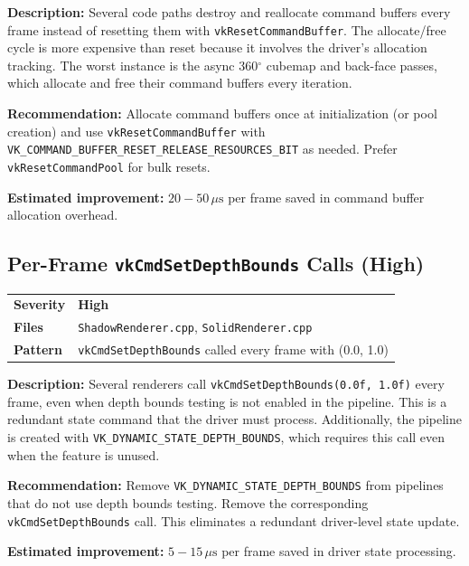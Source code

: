 \documentclass[a4paper,10pt]{article}
\newcommand{\us}{\ensuremath{\,\mu\text{s}}}
\newcommand{\degree}{\ensuremath{^\circ}}
\newcommand{\severity}[1]{%
  \ifstrequal{#1}{Critical}{\textcolor{critical}{\textbf{#1}}}{%
  \ifstrequal{#1}{High}{\textcolor{high}{\textbf{#1}}}{%
  \ifstrequal{#1}{Medium}{\textcolor{medium}{\textbf{#1}}}{%
  \ifstrequal{#1}{Low}{\textcolor{low}{\textbf{#1}}}{#1}}}}}
\begin{document}
\vspace{0.5em}
\noindent
\textbf{Description:} Several code paths destroy and reallocate command buffers
every frame instead of resetting them with \texttt{vkResetCommandBuffer}. The
allocate/free cycle is more expensive than reset because it involves the
driver's allocation tracking. The worst instance is the async 360\degree{}
cubemap and back-face passes, which allocate and free their command buffers
every iteration.

\noindent\textbf{Recommendation:} Allocate command buffers once at
initialization (or pool creation) and use \texttt{vkResetCommandBuffer} with
\texttt{VK\_COMMAND\_BUFFER\_RESET\_RELEASE\_RESOURCES\_BIT} as needed. Prefer
\texttt{vkResetCommandPool} for bulk resets.

\noindent\textbf{Estimated improvement:} $20{-}50\us$ per frame saved in
command buffer allocation overhead.

\subsection{Per-Frame \texttt{vkCmdSetDepthBounds} Calls (High)}

\begin{tabular}{ll}
\textbf{Severity} & \severity{High} \\
\textbf{Files}     & \texttt{ShadowRenderer.cpp},
                      \texttt{SolidRenderer.cpp} \\
\textbf{Pattern}   & \texttt{vkCmdSetDepthBounds} called every frame with
                      (0.0, 1.0) \\
\end{tabular}

\vspace{0.5em}
\noindent
\textbf{Description:} Several renderers call \texttt{vkCmdSetDepthBounds(0.0f,
1.0f)} every frame, even when depth bounds testing is not enabled in the
pipeline. This is a redundant state command that the driver must process.
Additionally, the pipeline is created with
\texttt{VK\_DYNAMIC\_STATE\_DEPTH\_BOUNDS}, which requires this call even
when the feature is unused.

\noindent\textbf{Recommendation:} Remove \texttt{VK\_DYNAMIC\_STATE\_DEPTH\_BOUNDS}
from pipelines that do not use depth bounds testing. Remove the corresponding
\texttt{vkCmdSetDepthBounds} call. This eliminates a redundant driver-level
state update.

\noindent\textbf{Estimated improvement:} $5{-}15\us$ per frame saved in driver
state processing.
\end{document}
